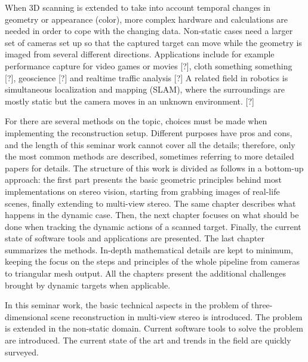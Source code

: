 When 3D scanning is extended to take into account temporal changes in geometry or appearance (color), more complex hardware and calculations are needed in order to cope with the changing data.
Non-static cases need a larger set of cameras set up so that the captured target can move while the geometry is imaged from several different directions. Applications include for example performance capture for video games or movies [?], cloth something something [?], geoscience [?] and realtime traffic analysis [?]
A related field in robotics is simultaneous localization and mapping (SLAM), where the surroundings are mostly static but the camera moves in an unknown environment. [?]


For there are several methods on the topic, choices must be made when implementing the reconstruction setup.
Different purposes have pros and cons, and the length of this seminar work cannot cover all the details; therefore, only the most common methods are described, sometimes referring to more detailed papers for details.
The structure of this work is divided as follows in a bottom-up approach: the first part presents the basic geometric principles behind most implementations on stereo vision, starting from grabbing images of real-life scenes, finally extending to multi-view stereo.
The same chapter describes what happens in the dynamic case.
Then, the next chapter focuses on what should be done when tracking the dynamic actions of a scanned target.
Finally, the current state of software tools and applications are presented. The last chapter summarizes the methods.
In-depth mathematical details are kept to minimum, keeping the focus on the steps and principles of the whole pipeline from cameras to triangular mesh output. All the chapters present the additional challenges brought by dynamic targets when applicable.

In this seminar work, the basic technical aspects in the problem of three-dimensional scene reconstruction in multi-view stereo is introduced. The problem is extended in the non-static domain. Current software tools to solve the problem are introduced. The current state of the art and trends in the field are quickly surveyed.
